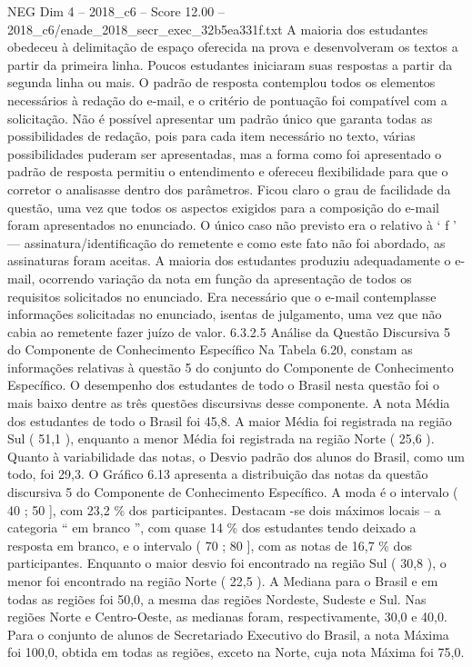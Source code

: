 \begin{textsample}{NEG Dim 4 – 2018\_c6 – Score 12.00 – 2018\_c6/enade\_2018\_secr\_exec\_32b5ea331f.txt}
A maioria dos estudantes obedeceu à delimitação de espaço oferecida na prova e desenvolveram os textos a partir da primeira linha.
Poucos estudantes iniciaram suas respostas a partir da segunda linha ou mais.
O padrão de resposta contemplou todos os elementos necessários à redação do e-mail, e o critério de pontuação foi compatível com a solicitação.
Não é possível apresentar um padrão único que garanta todas as possibilidades de redação, pois para cada item necessário no texto, várias possibilidades puderam ser apresentadas, mas a forma como foi apresentado o padrão de resposta permitiu o entendimento e ofereceu flexibilidade para que o corretor o analisasse dentro dos parâmetros.
Ficou claro o grau de facilidade da questão, uma vez que todos os aspectos exigidos para a composição do e-mail foram apresentados no enunciado.
O único caso não previsto era o relativo à ‘ f ’ — assinatura/identificação do remetente e como este fato não foi abordado, as assinaturas foram aceitas.
A maioria dos estudantes produziu adequadamente o e-mail, ocorrendo variação da nota em função da apresentação de todos os requisitos solicitados no enunciado.
Era necessário que o e-mail contemplasse informações solicitadas no enunciado, isentas de julgamento, uma vez que não cabia ao remetente fazer juízo de valor. 6.3.2.5 Análise da Questão Discursiva 5 do Componente de Conhecimento Específico Na Tabela 6.20, constam as informações relativas à questão 5 do conjunto do Componente de Conhecimento Específico.
O desempenho dos estudantes de todo o Brasil nesta questão foi o mais baixo dentre as três questões discursivas desse componente.
A nota Média dos estudantes de todo o Brasil foi 45,8.
A maior Média foi registrada na região Sul ( 51,1 ), enquanto a menor Média foi registrada na região Norte ( 25,6 ).
Quanto à variabilidade das notas, o Desvio padrão dos alunos do Brasil, como um todo, foi 29,3.
O Gráfico 6.13 apresenta a distribuição das notas da questão discursiva 5 do Componente de Conhecimento Específico.
A moda é o intervalo ( 40 ; 50 ], com 23,2 \% dos participantes.
Destacam -se dois máximos locais – a categoria “ em branco ”, com quase 14 \% dos estudantes tendo deixado a resposta em branco, e o intervalo ( 70 ; 80 ], com as notas de 16,7 \% dos participantes.
Enquanto o maior desvio foi encontrado na região Sul ( 30,8 ), o menor foi encontrado na região Norte ( 22,5 ).
A Mediana para o Brasil e em todas as regiões foi 50,0, a mesma das regiões Nordeste, Sudeste e Sul.
Nas regiões Norte e Centro-Oeste, as medianas foram, respectivamente, 30,0 e 40,0.
Para o conjunto de alunos de Secretariado Executivo do Brasil, a nota Máxima foi 100,0, obtida em todas as regiões, exceto na Norte, cuja nota Máxima foi 75,0.

\end{textsample}

